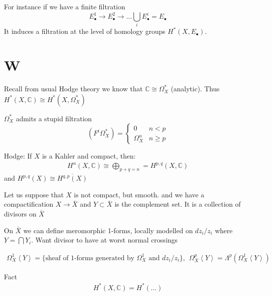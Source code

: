 For instance if we have a finite filtration 
\begin{equation}
    E_\bullet ^{1} \rightarrow     
    E_\bullet ^{2} \rightarrow     
    \dots 
    \bigcup_ i E_\bullet ^{i}  = E_\bullet 
\end{equation}
It induces a filtration at the level of homology groups $H^* ( X, E_\bullet) $. 


\section{W} %

Recall from usual Hodge theory we know that $ \mathbb{C} \cong \Omega_X ^* $ (analytic). 
Thus $H^*(X, \mathbb{C} ) \cong H^* ( X, \Omega_X ^* ) $ 

$\Omega_X ^ * $ admits a stupid filtration 
\begin{equation}
    (F^i \Omega_X ^* ) = \begin{cases} 
        0 & n<p \\
        \Omega_X ^n & n \geq p 
    \end{cases} 
\end{equation}

Hodge: If $ X$ is a Kahler and compact, then: 
\begin{align}
    H^n ( X, \mathbb{C} ) \cong \bigoplus_{p+q = n } = H^{p,q} ( X, \mathbb{C} ) 
\end{align}
and $ H^{p,q} ( X) \cong \overline{ H^{q,p} ( X) } $  

Let us suppose that $ X$ is not compact, but smooth. 
and we have a compactification $ X \rightarrow \bar{X} $ 
and $Y \subset \bar{X} $ is the complement set. 
It is a collection of divisors on $\bar{X} $ 

On $ \bar{X} $ we can define meromorphic 1-forms,
locally modelled on $ dz_i/z_i $ where $ Y = \bigcap Y_i $. 
Want divisor to have at worst normal crossings 

\begin{definition}
    \begin{align}
        \Omega_X ^ 1 \left< Y \right> = \{ \mbox{sheaf of 1-forms generated by $\Omega_X ^1$ and $dz_i / z_i$} \},~~
        \Omega_X ^p \left< Y \right> = \Lambda ^p ( \Omega_X ^1 \left< Y \right> ) 
    \end{align}


\end{definition}

Fact 
\begin{align}
    H^*  ( X, \mathbb{C}  ) = H^*  ( ...) 
\end{align}

